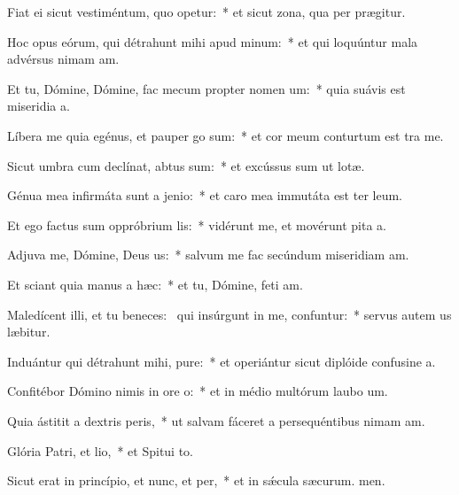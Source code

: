 \item Fiat ei sicut vestiméntum, quo opetur:~* et sicut zona, qua per prægitur.
\item Hoc opus eórum, qui détrahunt mihi apud minum:~* et qui loquúntur mala advérsus nimam am.
\item Et tu, Dómine, Dómine, fac mecum propter nomen um:~* quia suávis est miseridia a.
\item Líbera me quia egénus, et pauper go sum:~* et cor meum conturtum est tra me.
\item Sicut umbra cum declínat, abtus sum:~* et excússus sum ut lotæ.
\item Génua mea infirmáta sunt a jenio:~* et caro mea immutáta est ter leum.
\item Et ego factus sum oppróbrium lis:~* vidérunt me, et movérunt pita a.
\item Adjuva me, Dómine, Deus us:~* salvum me fac secúndum miseridiam am.
\item Et sciant quia manus a hæc:~* et tu, Dómine, feti am.
\item Maledícent illi, et tu beneces:~\pscross{} qui insúrgunt in me, confuntur:~* servus autem us læbitur.
\item Induántur qui détrahunt mihi, pure:~* et operiántur sicut diplóide confusine a.
\item Confitébor Dómino nimis in ore o:~* et in médio multórum laubo um.
\item Quia ástitit a dextris peris,~* ut salvam fáceret a persequéntibus nimam am.
\item Glória Patri, et lio,~* et Spitui to.
\item Sicut erat in princípio, et nunc, et per,~* et in sǽcula sæcurum. men.
